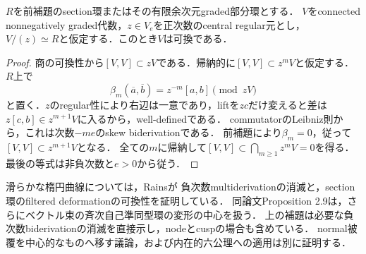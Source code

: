 \documentclass[11pt,a4paper]{ltjsarticle}
\begin{document}
\begin{proposition}[中心的な被覆の可換性]\label{prop:v7-central-commutativity}
$R$を前補題のsection環またはその有限余次元graded部分環とする．
$V$をconnected nonnegatively graded代数，$z\in V_e$を正次数のcentral regular元とし，
$V/(z)\simeq R$と仮定する．このとき$V$は可換である．
\end{proposition}
\begin{proof}
商の可換性から$[V,V]\subset zV$である．帰納的に$[V,V]\subset z^mV$と仮定する．
$R$上で
\[
 \beta_m(\overline a,\overline b)
 =z^{-m}[a,b]\pmod{zV}
\]
と置く．$z$のregular性により右辺は一意であり，liftを$zc$だけ変えると差は
$z[c,b]\in z^{m+1}V$に入るから，well-definedである．
commutatorのLeibniz則から，これは次数$-me$のskew biderivationである．
前補題により$\beta_m=0$，従って$[V,V]\subset z^{m+1}V$となる．
全ての$m$に帰納して$[V,V]\subset\bigcap_{m\geq1}z^mV=0$を得る．
最後の等式は非負次数と$e>0$から従う．
\end{proof}

\begin{remark}[既知の楕円変形との関係]
滑らかな楕円曲線については，Rains\cite[Corollaries 2.5--2.6]{RainsFiltered}が
負次数multiderivationの消滅と，section環のfiltered deformationの可換性を証明している．
同論文Proposition 2.9は，さらにベクトル束の斉次自己準同型環の変形の中心を扱う．
上の補題は必要な負次数biderivationの消滅を直接示し，nodeとcuspの場合も含めている．
normal被覆を中心的なものへ移す議論，および内在的六公理への適用は別に証明する．
\end{remark}
\end{document}
